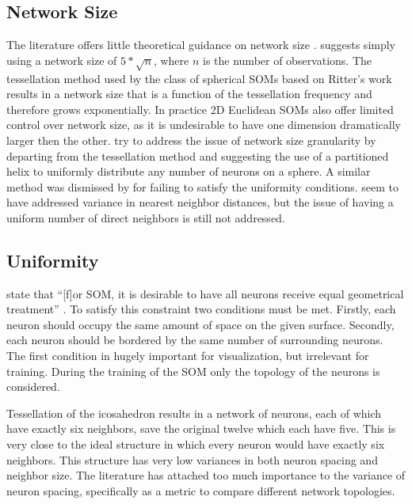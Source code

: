 \documentclass[11pt]{article}
\begin{document}
\subsection{Network Size}
The literature offers little theoretical guidance on network size
\citep{cho1996}.  \cite{toolbox} suggests simply using a network size of
\(5*\sqrt {n}\), where \(n\) is the number of observations.  The tessellation
method used by the class of spherical SOMs based on Ritter's work results in a
network size that is a function of the tessellation frequency and therefore
grows exponentially. In practice 2D Euclidean SOMs also offer limited control
over network size, as it is undesirable to have one dimension dramatically
larger then the other.  \cite{Nishio:2006fk} try to address the issue of network
size granularity by departing from the tessellation method and suggesting the
use of a partitioned helix to uniformly distribute any number of neurons on a
sphere.  A similar method was dismissed by \cite{wu2005} for failing to satisfy
the uniformity conditions.  \citeauthor{Nishio:2006fk} seem to have addressed
variance in nearest neighbor distances, but the issue of having a uniform number
of direct neighbors is still not addressed.

\subsection{Uniformity}
\citeauthor{wu2006} state that ``[f]or SOM, it is desirable to have all neurons
receive equal geometrical treatment'' \cite[pp. 900]{wu2006}.  To satisfy this
constraint two conditions must be met.  Firstly, each neuron should occupy the
same amount of space on the given surface.  Secondly, each neuron should be
bordered by the same number of surrounding neurons.  The first condition in
hugely important for visualization, but irrelevant for training.  During the
training of the SOM only the topology of the neurons is considered.


Tessellation of the icosahedron results in a network of neurons, each of which
have exactly six neighbors, save the original twelve which each have five.  This
is very close to the ideal structure in which every neuron would have exactly
six neighbors.  This structure has very low variances in both neuron spacing and
neighbor size.  The literature has attached too much importance to the variance
of neuron spacing, specifically as a metric to compare different network
topologies.
\end{document}
